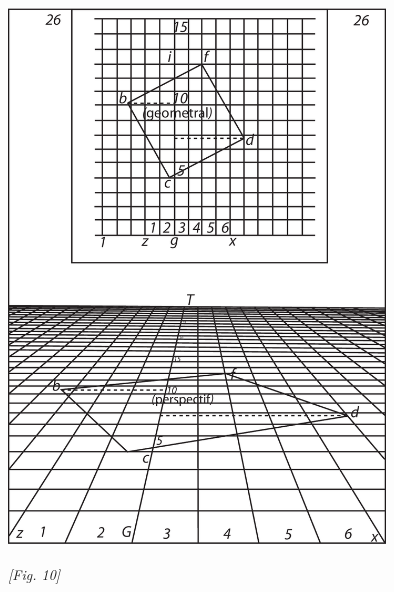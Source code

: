 \begin{center}
\includegraphics[width=0.75\textwidth]{images/T26-Desargues}
\\\rule[-4mm]{0mm}{10mm}\textit{[Fig. 10]}
\end{center}
                  